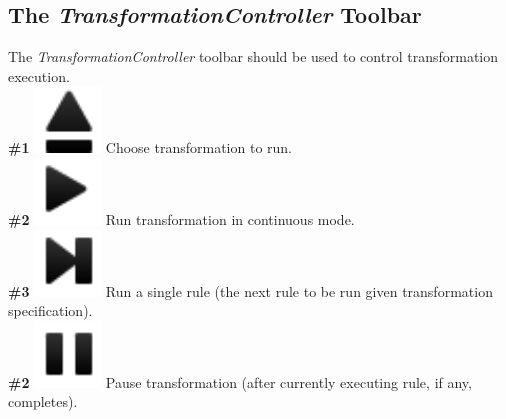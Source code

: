 \documentclass{article}
\numberwithin{equation}{section}
\numberwithin{figure}{section}
\begin{document}
\subsection{The \textit{TransformationController} Toolbar}
\label{ssec:transfctrltb}
The \textit{TransformationController} toolbar should be used to control transformation execution.\\

\textbf{\#1} \hspace*{1cm}
\includegraphics[scale=0.5]{figures/icon_load} \hspace*{1cm}
Choose transformation to run.\\

\textbf{\#2} \hspace*{1cm}
\includegraphics[scale=0.5]{figures/icon_play} \hspace*{1cm}
Run transformation in continuous mode.\\

\textbf{\#3} \hspace*{1cm}
\includegraphics[scale=0.5]{figures/icon_step} \hspace*{1cm}
Run a single rule (the next rule to be run given transformation specification).\\

\textbf{\#2} \hspace*{1cm}
\includegraphics[scale=0.5]{figures/icon_pause} \hspace*{1cm}
Pause transformation (after currently executing rule, if any, completes).\\
\end{document}
